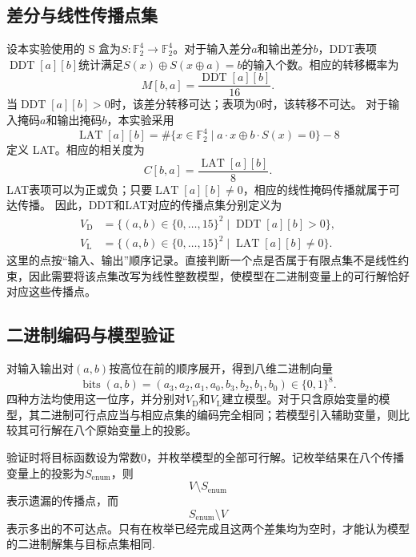 \subsection{差分与线性传播点集}
设本实验使用的 S 盒为$S:\mathbb{F}_2^4\to\mathbb{F}_2^4$。对于输入差分$a$和输出差分$b$，DDT表项$\operatorname{DDT}[a][b]$统计满足$S(x)\oplus S(x\oplus a)=b$的输入个数。相应的转移概率为
\[
M[b,a]=\frac{\operatorname{DDT}[a][b]}{16}.
\]
当$\operatorname{DDT}[a][b]>0$时，该差分转移可达；表项为0时，该转移不可达。
对于输入掩码$a$和输出掩码$b$，本实验采用
\[
\operatorname{LAT}[a][b]
=\#\{x\in\mathbb{F}_2^4\mid a\cdot x\oplus b\cdot S(x)=0\}-8
\]
定义 LAT。相应的相关度为
\[
C[b,a]=\frac{\operatorname{LAT}[a][b]}{8}.
\]
LAT表项可以为正或负；只要$\operatorname{LAT}[a][b]\ne0$，相应的线性掩码传播就属于可达传播。
因此，DDT和LAT对应的传播点集分别定义为
\[
\begin{aligned}
V_{\mathrm D}
&=\{(a,b)\in\{0,\ldots,15\}^2\mid \operatorname{DDT}[a][b]>0\},\\
V_{\mathrm L}
&=\{(a,b)\in\{0,\ldots,15\}^2\mid \operatorname{LAT}[a][b]\ne0\}.
\end{aligned}
\]
这里的点按“输入、输出”顺序记录。直接判断一个点是否属于有限点集不是线性约束，因此需要将该点集改写为线性整数模型，使模型在二进制变量上的可行解恰好对应这些传播点。

\subsection{二进制编码与模型验证}
对输入输出对$(a,b)$按高位在前的顺序展开，得到八维二进制向量
\[
\operatorname{bits}(a,b)
=(a_3,a_2,a_1,a_0,b_3,b_2,b_1,b_0)\in\{0,1\}^8.
\]
四种方法均使用这一位序，并分别对$V_{\mathrm D}$和$V_{\mathrm L}$建立模型。对于只含原始变量的模型，其二进制可行点应当与相应点集的编码完全相同；若模型引入辅助变量，则比较其可行解在八个原始变量上的投影。


验证时将目标函数设为常数0，并枚举模型的全部可行解。记枚举结果在八个传播变量上的投影为$S_{\mathrm{enum}}$，则
\[
V\setminus S_{\mathrm{enum}}
\]
表示遗漏的传播点，而
\[
S_{\mathrm{enum}}\setminus V
\]
表示多出的不可达点。只有在枚举已经完成且这两个差集均为空时，才能认为模型的二进制解集与目标点集相同.





